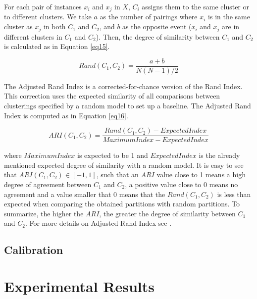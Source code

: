 \documentclass[review]{elsarticle}
\begin{document}
For each pair of instances $x_i$ and $x_j$ in $X$, $C_i$ assigns them to the same cluster or to different clusters. We take $a$ as the number of pairings where $x_i$ is in the same cluster as $x_j$ in both $C_1$ and $C_2$, and $b$ as the opposite event ($x_i$ and $x_j$ are in different clusters in $C_1$ and $C_2$). Then, the degree of similarity between $C_1$ and $C_2$ is calculated as in Equation \eqref{eq15}.

\begin{equation}
Rand(C_1, C_2) = \frac{a + b}{N(N - 1)/2}
\label{eq15}
\end{equation}

The Adjusted Rand Index is a corrected-for-chance version of the Rand Index. This correction uses the expected similarity of all comparisons between clusterings specified by a random model to set up a baseline. The Adjusted Rand Index is computed as in Equation \eqref{eq16}.

\begin{equation}
ARI(C_1, C_2) = \frac{Rand(C_1, C_2) - ExpectedIndex}{MaximumIndex - ExpectedIndex}
\label{eq16}
\end{equation}

where $MaximumIndex$ is expected to be 1 and $ExpectedIndex$ is the already mentioned expected degree of similarity with a random model. It is easy to see that $ARI(C_1, C_2) \in [-1,1]$, such that an $ARI$ value close to 1 means a high degree of agreement between $C_1$ and $C_2$, a positive value close to 0 means no agreement and a value smaller that 0 means that the $Rand(C_1, C_2)$ is less than expected when comparing the obtained partitions with random partitions. To summarize, the higher the $ARI$, the greater the degree of similarity between $C_1$ and $C_2$. For more details on Adjusted Rand Index see \cite{hubert1985comparing}.


\subsection{Calibration}

\clearpage

\section{Experimental Results}
\end{document}

